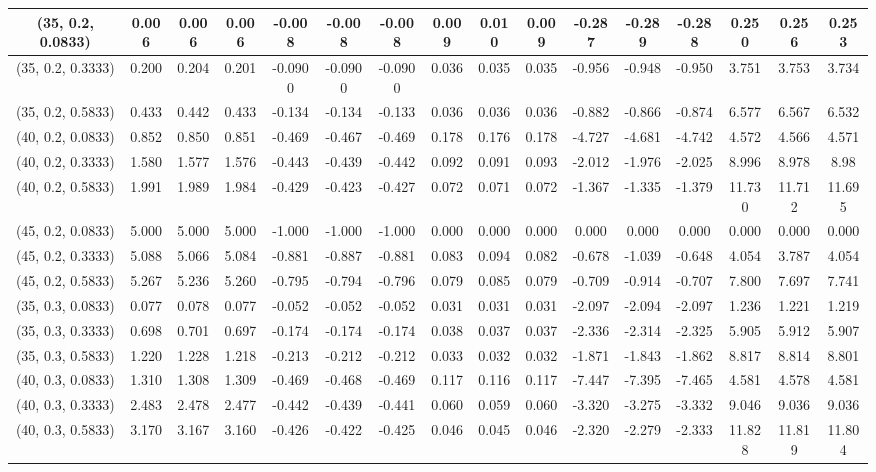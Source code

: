 \documentclass[preprint,12pt,1p]{elsarticle}
\begin{document}
\begin{table}[!h]
\begin{center}
{\begin{tabular}{| c | c | c | c | c | c | c| c| c| c| c| c| c| c| c| c|}
 (35, 0.2, 0.0833)&  0.006&  0.006&  0.006&  -0.008& -0.008&  -0.008& 0.009& 0.010& 0.009& -0.287& -0.289& -0.288& 0.250& 0.256& 0.253\\ \hline
 (35, 0.2, 0.3333)&  0.200&  0.204&  0.201&  -0.0900& -0.0900&  -0.0900& 0.036& 0.035& 0.035& -0.956& -0.948& -0.950& 3.751& 3.753& 3.734\\ \hline
 (35, 0.2, 0.5833)&  0.433&  0.442&  0.433&  -0.134& -0.134&  -0.133& 0.036& 0.036& 0.036& -0.882& -0.866& -0.874& 6.577& 6.567& 6.532\\ \hline
 (40, 0.2, 0.0833)&  0.852&  0.850&  0.851&  -0.469& -0.467&  -0.469& 0.178& 0.176& 0.178& -4.727& -4.681& -4.742& 4.572& 4.566& 4.571\\ \hline  
(40, 0.2, 0.3333) &  1.580&  1.577&  1.576&  -0.443& -0.439& -0.442 & 0.092& 0.091& 0.093& -2.012& -1.976& -2.025& 8.996& 8.978& 8.98\\ \hline 
(40, 0.2, 0.5833) &  1.991& 1.989 &  1.984&  -0.429& -0.423& -0.427 & 0.072& 0.071& 0.072& -1.367& -1.335& -1.379& 11.730& 11.712& 11.695\\ \hline
(45, 0.2, 0.0833)&  5.000&5.000&5.000&-1.000&-1.000&-1.000&0.000&0.000&0.000&0.000&0.000&0.000&0.000&0.000&0.000 \\ \hline    
(45, 0.2, 0.3333)&  5.088&5.066&5.084&-0.881&-0.887&-0.881&0.083&0.094&0.082&-0.678&-1.039&-0.648&4.054&3.787&4.054 \\ \hline    
(45, 0.2, 0.5833)&  5.267&5.236&5.260&-0.795&-0.794&-0.796&0.079&0.085&0.079&-0.709&-0.914&-0.707&7.800&7.697&7.741 \\ \hline  
(35, 0.3, 0.0833) &  0.077&  0.078&  0.077&  -0.052& -0.052& -0.052 & 0.031& 0.031& 0.031& -2.097& -2.094& -2.097& 1.236& 1.221& 1.219\\ \hline
 (35, 0.3, 0.3333)&  0.698& 0.701 & 0.697 & -0.174 & -0.174&  -0.174& 0.038& 0.037& 0.037& -2.336& -2.314& -2.325& 5.905& 5.912& 5.907 \\ \hline
(35, 0.3, 0.5833) &  1.220& 1.228 & 1.218 &  -0.213& -0.212& -0.212 & 0.033& 0.032& 0.032& -1.871& -1.843& -1.862& 8.817& 8.814& 8.801\\ \hline
(40, 0.3, 0.0833) &  1.310&  1.308&  1.309&  -0.469& -0.468& -0.469 & 0.117& 0.116& 0.117& -7.447& -7.395& -7.465& 4.581& 4.578& 4.581\\ \hline 
(40, 0.3, 0.3333) &  2.483&  2.478&  2.477& -0.442 & -0.439& -0.441 &0.060 & 0.059& 0.060& -3.320& -3.275& -3.332& 9.046& 9.036& 9.036\\ \hline 
(40, 0.3, 0.5833) &  3.170&  3.167&  3.160&  -0.426& -0.422& -0.425 & 0.046& 0.045& 0.046& -2.320& -2.279& -2.333& 11.828& 11.819& 11.804\\ \hline     

\end{tabular}}
\end{center}
\end{table}
\end{document}
